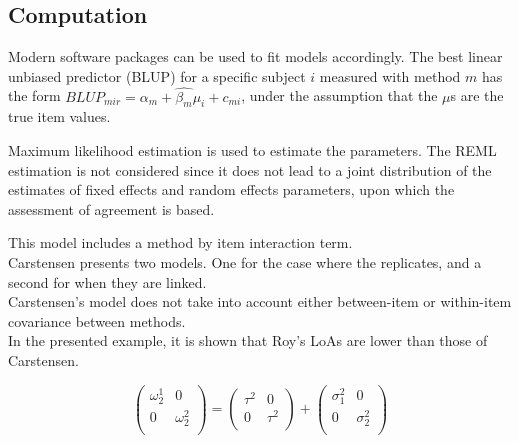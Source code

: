 \documentclass[12pt, a4paper]{report}
\theoremstyle{plain}
\theoremstyle{definition}
\theoremstyle{remark}
\begin{document}
\subsection{Computation} Modern software
packages can be used to fit models accordingly. The best linear
unbiased predictor (BLUP) for a specific subject $i$ measured with
method $m$ has the form $BLUP_{mir} = \hat{\alpha_{m}} +
\hat{\beta_{m}}\mu_{i} + c_{mi}$, under the assumption that the
$\mu$s are the true item values.



Maximum likelihood estimation is used to estimate the parameters.
The REML estimation is not considered since it does not lead to a
joint distribution of the estimates of fixed effects and random
effects parameters, upon which the assessment of agreement is
based.







%

%


This model includes a method by item interaction term.\\

Carstensen presents two models. One for the case where the replicates, and a second for when they are linked.\\
Carstensen's model does not take into account either between-item or within-item covariance between methods.\\
In the presented example, it is shown that Roy's LoAs are lower than those of Carstensen.




\[\left(\begin{array}{cc}
\omega^1_2  & 0 \\
0 & \omega^2_2 \\
\end{array}  \right)
=  \left(
\begin{array}{cc}
\tau^2  & 0 \\
0 & \tau^2 \\
\end{array} \right)+
\left(
\begin{array}{cc}
\sigma^2_1  & 0 \\
0 & \sigma^2_2 \\
\end{array}\right)
\]
\end{document}
